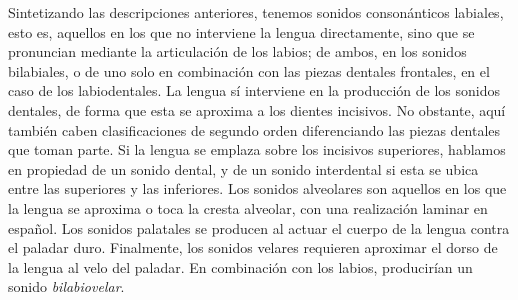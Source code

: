 Sintetizando las descripciones anteriores, tenemos sonidos consonánticos labiales, esto es, aquellos en los que no interviene la lengua directamente, sino que se pronuncian mediante la articulación de los labios; de ambos, en los sonidos bilabiales, o de uno solo en combinación con las piezas dentales frontales, en el caso de los labiodentales. La lengua sí interviene en la producción de los sonidos dentales,  de forma que esta se aproxima a los dientes incisivos. No obstante, aquí también caben clasificaciones de segundo orden diferenciando las piezas dentales que toman parte. Si la lengua se emplaza sobre los incisivos superiores, hablamos en propiedad de un sonido dental, y de un sonido interdental si esta se ubica entre las superiores y las inferiores. Los sonidos alveolares son aquellos en los que la lengua se aproxima o toca la cresta alveolar, con una realización laminar en español. Los sonidos palatales se producen al actuar el cuerpo de la lengua contra el paladar duro. Finalmente, los sonidos velares requieren aproximar el dorso de la lengua al velo del paladar. En combinación con los labios, producirían un sonido \textit{bilabiovelar}.

